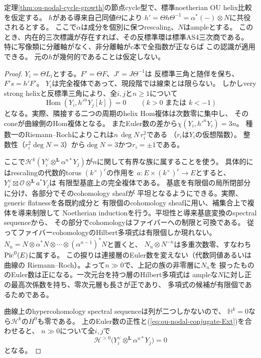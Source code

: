 \begin{theorem}[ampleな幾何的共役からの標識付き認識]
\label{thm:ou-nodal-ample-conjugacy}
定理\ref{thm:ou-nodal-cycle-growth}の節点cycle型で、標準noetherian OU helix比較を仮定する。
$h$がある導来自己同値$\Theta$により
$h'=\Theta h\Theta^{-1}=\alpha^*(-)\otimes N$に共役されるとする。
ここで$\alpha$は成分を個別に保つrescaling、$N$はampleとする。
このとき、内在的三次標識が存在すれば、その反標準環は標準AS4三次商である。
特に写像類に分離軸がなく、非分離軸が$c$本で全指数が正ならば
この認識が適用できる。
元の$h$が幾何的であることは仮定しない。
\end{theorem}
\begin{proof}
$Y_i=\Theta L_i$とする。$F'=\Theta F$、$J'=J\Theta^{-1}$は
反標準三角と随伴を保ち、$F's=h'F'$。
$Y_i$は完全複体であって、現段階では線束とは限らない。
しかしvery strong helixと反標準三角により、全$i,j$と$n\ge1$について
\begin{equation}\label{eq:ou-nodal-conjugate-Ext}
 \operatorname{Hom}(Y_i,h'^nY_j[k])=0\qquad(k>0\text{ または }k<-1)
\end{equation}
となる。実際、隣接する二つの周期のhelix Hom複体は次数零に集中し、
そのconeが曲線側のHom複体となる。
またEuler数の差から$\chi(Y_i,h'^nY_i)=3n$。
種数一のRiemann--Rochによりこれは$n\,\deg N\,r_i^2$である
（$r_i$は$Y_i$の仮想階数）。
整数性（$r_i^2\deg N=3$）から$\deg N=3$かつ$r_i=\pm1$である。

ここで$\mathcal H^k(Y_i^\vee\otimes^{\mathbf L}
\alpha^{n*}Y_j)$が$n$に関して有界な族に属することを使う。
具体的にはrescalingの代数的torus $(k^\times)^c$の作用を
$a:E\times(k^\times)^c\to E$とすると、
$Y_i^\vee\boxtimes\mathcal O\otimes^{\mathbf L}a^*Y_j$は
有限型基底上の完全複体である。
基底を有限個の局所閉部分に分け、各部分でそのcohomology sheafが
平坦となるようにできる。実際、generic flatnessを各既約成分と
有限個のcohomology sheafに用い、補集合上で複体を導来制限して
Noetherian inductionを行う。平坦性と導来基底変換のspectral sequenceから、
その部分でcohomologyはファイバーへの制限と可換である。
従ってファイバーcohomologyのHilbert多項式は有限個しか現れない。
$N_n=N\otimes\alpha^*N\otimes\cdots\otimes(\alpha^{n-1})^*N$と置くと、
$N_n\otimes N^{-n}$は多重次数零、すなわち$\operatorname{Pic}^0(E)$に属する。
この捩りは連接層のEuler数を変えない（代数同値あるいは曲線の
Riemann--Roch）。よって$n\gg0$で、上記の族の非零層に$N_n$を
捩ったもののEuler数は正になる。一次元台を持つ層のHilbert多項式は
ampleな$N$に対し正の最高次係数を持ち、零次元層も長さが正であり、
多項式の候補が有限個であるためである。

曲線上のhypercohomology spectral sequenceは列が二つしかないので、
$\mathbb H^k=0$なら$\mathcal H^k$の$H^0$も零である。
上のEuler数の正性と(\ref{eq:ou-nodal-conjugate-Ext})を合わせると、
$n\gg0$について全$i,j$で
\begin{equation}\label{eq:ou-nodal-no-positive-local}
 \mathcal H^{>0}\bigl(Y_i^\vee\otimes^{\mathbf L}\alpha^{n*}Y_j\bigr)=0
\end{equation}
となる。


\end{proof}
